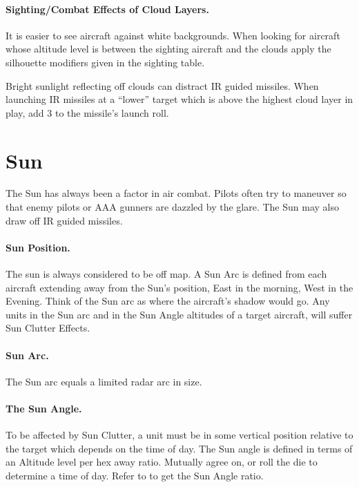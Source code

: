 \begin{advancedrules}
\paragraph{Sighting/Combat Effects of Cloud Layers.} It is easier to see aircraft against white backgrounds. When looking for aircraft whose altitude level is between the sighting aircraft and the clouds apply the silhouette modifiers given in the sighting table.

Bright sunlight reflecting off clouds can distract IR guided missiles. When launching IR missiles at a “lower” target which is above the highest cloud layer in play, add 3 to the missile's launch roll.

\section{Sun}
\label{rule:sun}


The Sun has always been a factor in air combat. Pilots often try to maneuver so that enemy pilots or AAA gunners are dazzled by the glare. The Sun may also draw off IR guided missiles.

\paragraph{Sun Position.} The sun is always considered to be off map. A Sun Arc is defined from each aircraft extending away from the Sun's position, East in the morning, West in the Evening. Think of the Sun arc as where the aircraft's shadow would go. Any units in the Sun arc and in the Sun Angle altitudes of a target aircraft, will suffer Sun Clutter Effects.

\paragraph{Sun Arc.} The Sun arc equals a limited radar arc in size. 


\paragraph{The Sun Angle.} To be affected by Sun Clutter, a unit must be in some vertical position relative to the target which depends on the time of day. The Sun angle is defined in terms of an Altitude level per hex away ratio. Mutually agree on, or roll the die to determine a time of day. Refer to  to get the Sun Angle ratio.


\end{advancedrules}
